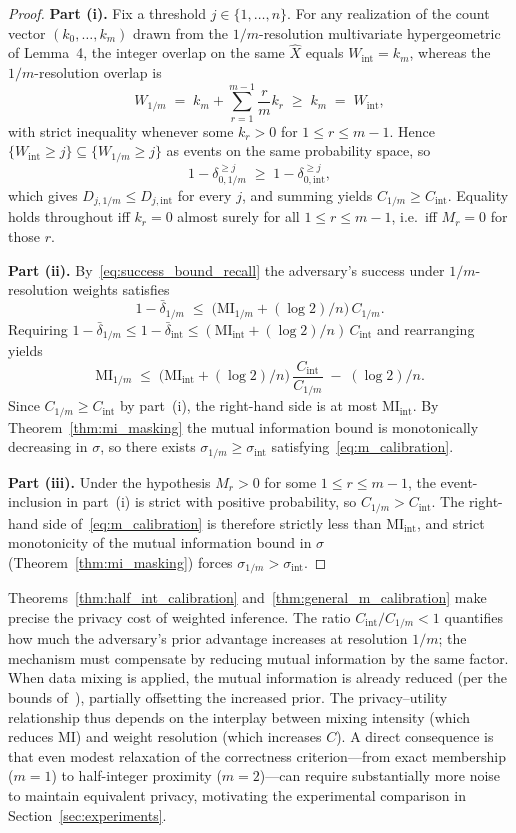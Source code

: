 \documentclass[letterpaper]{article} %
\newcommand{\MI}{\mathrm{MI}}
\begin{document}
\begin{proof}
\textbf{Part (i).} Fix a threshold $j \in \{1,\dots,n\}$. For any realization of the count vector $(k_0,\dots,k_m)$ drawn from the $1/m$-resolution multivariate hypergeometric of Lemma~4, the integer overlap on the same $\widehat{X}$ equals $W_{\mathrm{int}} = k_m$, whereas the $1/m$-resolution overlap is
\[
W_{1/m}
\;=\;
k_m + \sum_{r=1}^{m-1}\frac{r}{m}k_r
\;\ge\; k_m
\;=\; W_{\mathrm{int}},
\]
with strict inequality whenever some $k_r > 0$ for $1 \le r \le m-1$. Hence $\{W_{\mathrm{int}} \ge j\} \subseteq \{W_{1/m} \ge j\}$ as events on the same probability space, so
\[
1 - \delta_{0,1/m}^{\ge j}
\;\ge\;
1 - \delta_{0,\mathrm{int}}^{\ge j},
\]
which gives $D_{j,1/m} \le D_{j,\mathrm{int}}$ for every $j$, and summing yields $C_{1/m} \ge C_{\mathrm{int}}$. Equality holds throughout iff $k_r = 0$ almost surely for all $1 \le r \le m-1$, i.e.\ iff $M_r = 0$ for those $r$.

\textbf{Part (ii).} By~\eqref{eq:success_bound_recall} the adversary's success under $1/m$-resolution weights satisfies
\[
1 - \bar{\delta}_{1/m}
\;\le\;
\big(\MI_{1/m} + (\log 2)/n\big)\, C_{1/m}.
\]
Requiring $1 - \bar{\delta}_{1/m} \le 1 - \bar{\delta}_{\mathrm{int}} \le (\MI_{\mathrm{int}} + (\log 2)/n)\, C_{\mathrm{int}}$ and rearranging yields
\[
\MI_{1/m}
\;\le\;
\big(\MI_{\mathrm{int}} + (\log 2)/n\big)\,\frac{C_{\mathrm{int}}}{C_{1/m}}
\;-\; (\log 2)/n.
\]
Since $C_{1/m} \ge C_{\mathrm{int}}$ by part~(i), the right-hand side is at most $\MI_{\mathrm{int}}$. By Theorem~\ref{thm:mi_masking} the mutual information bound is monotonically decreasing in $\sigma$, so there exists $\sigma_{1/m} \ge \sigma_{\mathrm{int}}$ satisfying~\eqref{eq:m_calibration}.

\textbf{Part (iii).} Under the hypothesis $M_r > 0$ for some $1 \le r \le m-1$, the event-inclusion in part~(i) is strict with positive probability, so $C_{1/m} > C_{\mathrm{int}}$. The right-hand side of~\eqref{eq:m_calibration} is therefore strictly less than $\MI_{\mathrm{int}}$, and strict monotonicity of the mutual information bound in $\sigma$ (Theorem~\ref{thm:mi_masking}) forces $\sigma_{1/m} > \sigma_{\mathrm{int}}$.
\end{proof}

Theorems~\ref{thm:half_int_calibration} and~\ref{thm:general_m_calibration} make precise the privacy cost of weighted inference. The ratio $C_{\mathrm{int}}/C_{1/m} < 1$ quantifies how much the adversary's prior advantage increases at resolution $1/m$; the mechanism must compensate by reducing mutual information by the same factor. When data mixing is applied, the mutual information is already reduced (per the bounds of~\cite{xiao2024formal}), partially offsetting the increased prior. The privacy--utility relationship thus depends on the interplay between mixing intensity (which reduces $\MI$) and weight resolution (which increases $C$). A direct consequence is that even modest relaxation of the correctness criterion---from exact membership ($m=1$) to half-integer proximity ($m=2$)---can require substantially more noise to maintain equivalent privacy, motivating the experimental comparison in Section~\ref{sec:experiments}.
\end{document}
